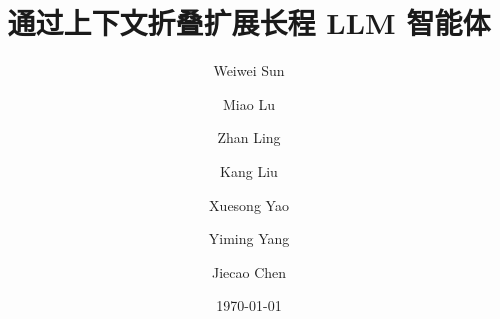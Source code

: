 \documentclass[]{bytedance_seed_zh}
\title{通过上下文折叠扩展长程 LLM 智能体}
\author[1,2,*]{Weiwei Sun}
\author[1,3,*]{Miao Lu}
\author[1]{Zhan Ling}
\author[1]{Kang Liu}
\author[1]{Xuesong Yao}
\author[2]{Yiming Yang}
\author[1, \dagger]{Jiecao Chen}
\affiliation[1]{ByteDance Seed}
\affiliation[2]{卡内基梅隆大学}
\affiliation[3]{斯坦福大学}
\date{\today}
\begin{document}
\maketitle






\clearpage

\beginappendix


\end{document}
